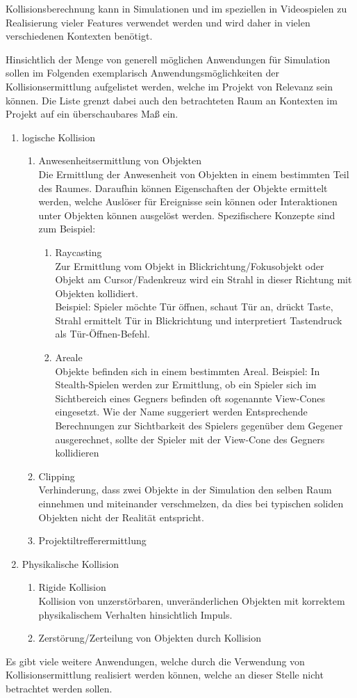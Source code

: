 Kollisionsberechnung kann in Simulationen und im speziellen in Videospielen zu Realisierung vieler Features verwendet werden und wird daher in vielen verschiedenen Kontexten benötigt. 

Hinsichtlich der Menge von generell möglichen Anwendungen für Simulation sollen im Folgenden exemplarisch Anwendungsmöglichkeiten der Kollisionsermittlung aufgelistet werden, welche im Projekt von Relevanz sein können. Die Liste grenzt dabei auch den betrachteten Raum an Kontexten im Projekt auf ein überschaubares Maß ein. 

\begin{enumerate}
	\item logische Kollision\\
	\begin{enumerate}
		\item Anwesenheitsermittlung von Objekten\\
	Die Ermittlung der Anwesenheit von Objekten in einem bestimmten Teil des Raumes. Daraufhin können Eigenschaften der Objekte ermittelt werden, welche Auslöser für Ereignisse sein können oder Interaktionen unter Objekten können ausgelöst werden. Spezifischere Konzepte sind zum Beispiel: 
		\begin{enumerate}
			\item Raycasting\\
	Zur Ermittlung vom Objekt in Blickrichtung/Fokusobjekt oder Objekt am Cursor/Fadenkreuz wird ein Strahl in dieser Richtung mit Objekten kollidiert.\\
	Beispiel: Spieler möchte Tür öffnen, schaut Tür an, drückt Taste, Strahl ermittelt Tür in Blickrichtung und interpretiert Tastendruck als Tür-Öffnen-Befehl.
			\item Areale\\
	Objekte befinden sich in einem bestimmten Areal.
	Beispiel: In Stealth-Spielen werden zur Ermittlung, ob ein  Spieler sich im Sichtbereich eines Gegners befinden oft sogenannte View-Cones eingesetzt. Wie der Name suggeriert werden Entsprechende Berechnungen zur Sichtbarkeit des Spielers gegenüber dem Gegener ausgerechnet, sollte der Spieler mit der View-Cone des Gegners kollidieren
		\end{enumerate}
		\item Clipping\\
	Verhinderung, dass zwei Objekte in der Simulation den selben Raum einnehmen und miteinander verschmelzen, da dies bei typischen soliden Objekten nicht der Realität entspricht.
		\item Projektiltrefferermittlung
	\end{enumerate}

	\item Physikalische Kollision
		\begin{enumerate}
			\item Rigide Kollision\\
		Kollision von unzerstörbaren, unveränderlichen Objekten mit korrektem physikalischem Verhalten hinsichtlich Impuls.
			\item Zerstörung/Zerteilung von Objekten durch Kollision
		\end{enumerate}
\end{enumerate}

Es gibt viele weitere Anwendungen, welche durch die Verwendung von Kollisionsermittlung realisiert werden können, welche an dieser Stelle nicht betrachtet werden sollen.

